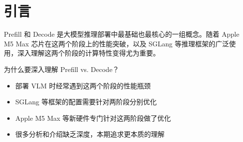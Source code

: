 \section{引言}

Prefill 和 Decode 是大模型推理部署中最基础也最核心的一组概念。随着 Apple M5 Max 芯片在这两个阶段上的性能突破，以及 SGLang 等推理框架的广泛使用，深入理解这两个阶段的计算特性变得尤为重要。

\begin{knowledgebox}{为什么要深入理解 Prefill vs. Decode？}
\begin{itemize}
  \item 部署 VLM 时经常遇到这两个阶段的性能瓶颈
  \item SGLang 等框架的配置需要针对两阶段分别优化
  \item Apple M5 Max 等新硬件专门针对这两阶段做了优化
  \item 很多分析和介绍缺乏深度，本期追求更本质的理解
\end{itemize}
\end{knowledgebox}

